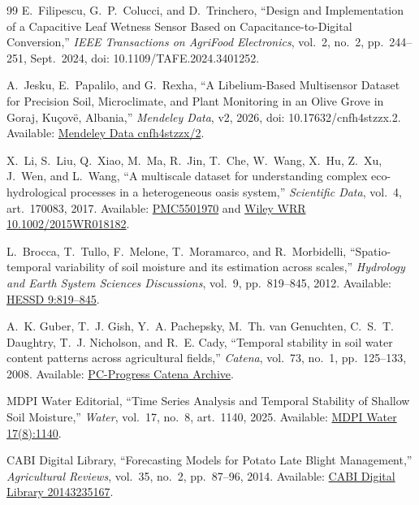 \documentclass[10pt,twocolumn,a4paper]{article}
\begin{document}
\begin{thebibliography}{99}
E.~Filipescu, G.~P.~Colucci, and D.~Trinchero, ``Design and Implementation of a Capacitive Leaf Wetness Sensor Based on Capacitance-to-Digital Conversion,'' \textit{IEEE Transactions on AgriFood Electronics}, vol.~2, no.~2, pp.~244--251, Sept.~2024, doi: 10.1109/TAFE.2024.3401252.

A.~Jesku, E.~Papalilo, and G.~Rexha, ``A Libelium-Based Multisensor Dataset for Precision Soil, Microclimate, and Plant Monitoring in an Olive Grove in Goraj, Ku\c{c}ov{\"{e}}, Albania,'' \textit{Mendeley Data}, v2, 2026, doi: 10.17632/cnfh4stzzx.2. Available: \href{https://data.mendeley.com/datasets/cnfh4stzzx/2}{Mendeley Data cnfh4stzzx/2}.

X.~Li, S.~Liu, Q.~Xiao, M.~Ma, R.~Jin, T.~Che, W.~Wang, X.~Hu, Z.~Xu, J.~Wen, and L.~Wang, ``A multiscale dataset for understanding complex eco-hydrological processes in a heterogeneous oasis system,'' \textit{Scientific Data}, vol.~4, art.~170083, 2017. Available: \href{https://pmc.ncbi.nlm.nih.gov/articles/PMC5501970/}{PMC5501970} and \href{https://onlinelibrary.wiley.com/doi/10.1002/2015WR018182}{Wiley WRR 10.1002/2015WR018182}.

L.~Brocca, T.~Tullo, F.~Melone, T.~Moramarco, and R.~Morbidelli, ``Spatio-temporal variability of soil moisture and its estimation across scales,'' \textit{Hydrology and Earth System Sciences Discussions}, vol.~9, pp.~819--845, 2012. Available: \href{https://hess.copernicus.org/preprints/9/819/2012/hessd-9-819-2012.pdf}{HESSD 9:819--845}.

A.~K. Guber, T.~J. Gish, Y.~A. Pachepsky, M.~Th. van Genuchten, C.~S.~T. Daughtry, T.~J. Nicholson, and R.~E. Cady, ``Temporal stability in soil water content patterns across agricultural fields,'' \textit{Catena}, vol.~73, no.~1, pp.~125--133, 2008. Available: \href{https://www.pc-progress.com/documents/rvgenugten/guber_et_al_catena_2008.pdf}{PC-Progress Catena Archive}.

MDPI Water Editorial, ``Time Series Analysis and Temporal Stability of Shallow Soil Moisture,'' \textit{Water}, vol.~17, no.~8, art.~1140, 2025. Available: \href{https://www.mdpi.com/2073-4441/17/8/1140}{MDPI Water 17(8):1140}.

CABI Digital Library, ``Forecasting Models for Potato Late Blight Management,'' \textit{Agricultural Reviews}, vol.~35, no.~2, pp.~87--96, 2014. Available: \href{https://www.cabidigitallibrary.org/doi/pdf/10.5555/20143235167}{CABI Digital Library 20143235167}.


\end{thebibliography}
\end{document}

